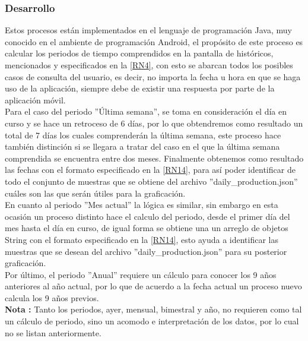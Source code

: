 \subsubsection{Desarrollo}
Estos procesos están implementados en el lenguaje de programación Java, muy conocido en el ambiente de programación Android, el propósito de este proceso es calcular los periodos de tiempo comprendidos en la pantalla de históricos, mencionados y especificados en la  \ref{RN4}, con esto se abarcan todos los posibles casos de consulta del usuario, es decir, no importa la fecha u hora en que se haga uso de la aplicación, siempre debe de existir una respuesta por parte de la aplicación móvil. \\ \newline
Para el caso del periodo ''Última semana'', se toma en consideración el día en curso y se hace un retroceso de 6 días, por lo que obtendremos como resultado un total de 7 días los cuales comprenderán la última semana, este proceso hace también distinción si se llegara a tratar del caso en el que la última semana comprendida se encuentra entre dos meses. Finalmente obtenemos como resultado las fechas con el formato especificado en la \ref{RN14}, para así poder identificar de todo el conjunto de muestras que se obtiene del archivo ''daily\_production.json'' cuáles son las que serán útiles para la graficación. \\ \newline
En cuanto al periodo ''Mes actual''  la lógica es similar, sin embargo en esta ocasión un proceso distinto hace el calculo del periodo, desde el primer día del mes hasta el día en curso, de igual forma se obtiene una un arreglo de objetos String con el formato especificado en la \ref{RN14}, esto ayuda a identificar las muestras que se desean del archivo ''daily\_production.json'' para su posterior graficación. \\ \newline
Por último, el periodo ''Anual'' requiere un cálculo para conocer los 9 años anteriores al año actual, por lo que de acuerdo a la fecha actual un proceso nuevo calcula los 9 años previos. \\ \newline
\textbf{Nota :} Tanto los periodos, ayer, mensual, bimestral y año, no requieren como tal un cálculo de periodo, sino un acomodo e interpretación de los datos, por lo cual no se listan anteriormente. 

